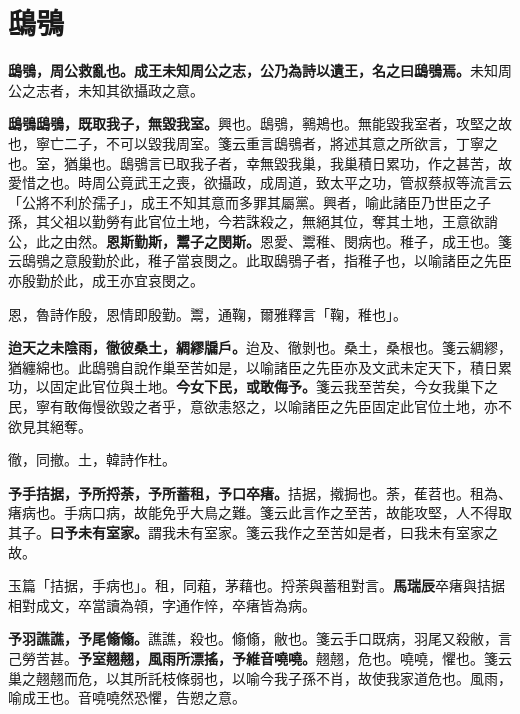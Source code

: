 \section{鴟鴞}


\textbf{鴟鴞，周公救亂也。成王未知周公之志，公乃為詩以遺王，名之曰鴟鴞焉。}{\footnotesize 未知周公之志者，未知其欲攝政之意。}

\textbf{鴟鴞鴟鴞，既取我子，無毀我室。}{\footnotesize 興也。鴟鴞，鸋鴂也。無能毀我室者，攻堅之故也，寧亡二子，不可以毀我周室。箋云重言鴟鴞者，將述其意之所欲言，丁寧之也。室，猶巢也。鴟鴞言已取我子者，幸無毀我巢，我巢積日累功，作之甚苦，故愛惜之也。時周公竟武王之喪，欲攝政，成周道，致太平之功，管叔蔡叔等流言云「公將不利於孺子」，成王不知其意而多罪其屬黨。興者，喻此諸臣乃世臣之子孫，其父祖以勤勞有此官位土地，今若誅殺之，無絕其位，奪其土地，王意欲誚公，此之由然。}\textbf{恩斯勤斯，鬻子之閔斯。}{\footnotesize 恩愛、鬻稚、閔病也。稚子，成王也。箋云鴟鴞之意殷勤於此，稚子當哀閔之。此取鴟鴞子者，指稚子也，以喻諸臣之先臣亦殷勤於此，成王亦宜哀閔之。}

\begin{quoting}恩，魯詩作殷，恩情即殷勤。鬻，通鞠，爾雅釋言「鞠，稚也」。\end{quoting}

\textbf{迨天之未陰雨，徹彼桑土，綢繆牖戶。}{\footnotesize 迨及、徹剝也。桑土，桑根也。箋云綢繆，猶纏綿也。此鴟鴞自說作巢至苦如是，以喻諸臣之先臣亦及文武未定天下，積日累功，以固定此官位與土地。}\textbf{今女下民，或敢侮予。}{\footnotesize 箋云我至苦矣，今女我巢下之民，寧有敢侮慢欲毀之者乎，意欲恚怒之，以喻諸臣之先臣固定此官位土地，亦不欲見其絕奪。}

\begin{quoting}徹，同撤。土，韓詩作杜。\end{quoting}

\textbf{予手拮据，予所捋荼，予所蓄租，予口卒瘏。}{\footnotesize 拮据，撠挶也。荼，萑苕也。租為、瘏病也。手病口病，故能免乎大鳥之難。箋云此言作之至苦，故能攻堅，人不得取其子。}\textbf{曰予未有室家。}{\footnotesize 謂我未有室家。箋云我作之至苦如是者，曰我未有室家之故。}

\begin{quoting}玉篇「拮据，手病也」。租，同蒩，茅藉也。捋荼與蓄租對言。\textbf{馬瑞辰}卒瘏與拮据相對成文，卒當讀為顇，字通作悴，卒瘏皆為病。\end{quoting}

\textbf{予羽譙譙，予尾翛翛。}{\footnotesize 譙譙，殺也。翛翛，敝也。箋云手口既病，羽尾又殺敝，言己勞苦甚。}\textbf{予室翹翹，風雨所漂搖，予維音嘵嘵。}{\footnotesize 翹翹，危也。嘵嘵，懼也。箋云巢之翹翹而危，以其所託枝條弱也，以喻今我子孫不肖，故使我家道危也。風雨，喻成王也。音嘵嘵然恐懼，告愬之意。}

